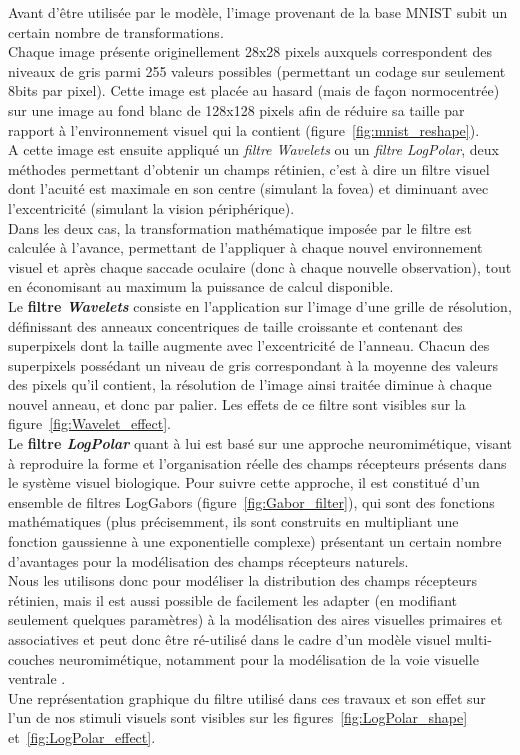 Avant d'être utilisée par le modèle, l'image provenant de la base MNIST subit un certain nombre de transformations.\\
Chaque image présente originellement 28x28 pixels auxquels correspondent des niveaux de gris parmi 255 valeurs possibles (permettant un codage sur seulement 8bits par pixel). Cette image est placée au hasard (mais de façon normocentrée) sur une image au fond blanc de 128x128 pixels afin de réduire sa taille par rapport à l'environnement visuel qui la contient (figure~\ref{fig:mnist_reshape}).\\
A cette image est ensuite appliqué un \textit{filtre Wavelets} ou un \textit{filtre LogPolar}, deux méthodes permettant d'obtenir un champs rétinien, c'est à dire un filtre visuel dont l'acuité est maximale en son centre (simulant la fovea) et diminuant avec l'excentricité (simulant la vision périphérique). \\
Dans les deux cas, la transformation mathématique imposée par le filtre est calculée à l'avance, permettant de l'appliquer à chaque nouvel environnement visuel et après chaque saccade oculaire (donc à chaque nouvelle observation), tout en économisant au maximum la puissance de calcul disponible.\autocite{Kortum1996}\\
Le \textbf{filtre \textit{Wavelets}} consiste en l'application sur l'image d'une grille de résolution, définissant des anneaux concentriques de taille croissante et contenant des superpixels dont la taille augmente avec l'excentricité de l'anneau. Chacun des superpixels possédant un niveau de gris correspondant à la moyenne des valeurs des pixels qu'il contient, la résolution de l'image ainsi traitée diminue à chaque nouvel anneau, et donc par palier.\autocite{Kortum1996}
Les effets de ce filtre sont visibles sur la figure~\ref{fig:Wavelet_effect}.\\
Le \textbf{filtre \textit{LogPolar}} quant à lui est basé sur une approche neuromimétique, visant à reproduire la forme et l'organisation réelle des champs récepteurs présents dans le système visuel biologique. Pour suivre cette approche, il est constitué d'un ensemble de filtres LogGabors (figure~\ref{fig:Gabor_filter}), qui sont des fonctions mathématiques (plus précisemment, ils sont construits en multipliant une fonction gaussienne à une exponentielle complexe) présentant un certain nombre d'avantages pour la modélisation des champs récepteurs naturels\autocite{Fischer2007}. \\
Nous les utilisons donc pour modéliser la distribution des champs récepteurs rétinien, mais il est aussi possible de facilement les adapter (en modifiant seulement quelques paramètres) à la modélisation des aires visuelles primaires et associatives et peut donc être ré-utilisé dans le cadre d'un modèle visuel multi-couches neuromimétique, notamment pour la modélisation de la voie visuelle ventrale \autocite{Freeman2011}. \\
Une représentation graphique du filtre utilisé dans ces travaux et son effet sur l'un de nos stimuli visuels sont visibles sur les figures~\ref{fig:LogPolar_shape} et~\ref{fig:LogPolar_effect}. \\

